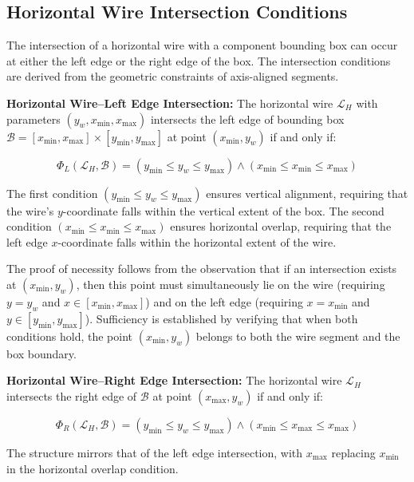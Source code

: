 \subsection{Horizontal Wire Intersection Conditions}

The intersection of a horizontal wire with a component bounding box can occur at either the left edge or the right edge of the box. The intersection conditions are derived from the geometric constraints of axis-aligned segments.

\textbf{Horizontal Wire–Left Edge Intersection:} The horizontal wire $\mathcal{L}_H$ with parameters $(y_w, x_{\min}, x_{\max})$ intersects the left edge of bounding box $\mathcal{B} = [x_{\min}, x_{\max}] \times [y_{\min}, y_{\max}]$ at point $(x_{\min}, y_w)$ if and only if:

\begin{equation}
\Phi_L(\mathcal{L}_H, \mathcal{B}) = (y_{\min} \le y_w \le y_{\max}) \land (x_{\min} \le x_{\min} \le x_{\max})
\label{eq:horizontal-left-intersection}
\end{equation}

The first condition $(y_{\min} \le y_w \le y_{\max})$ ensures vertical alignment, requiring that the wire's $y$-coordinate falls within the vertical extent of the box. The second condition $(x_{\min} \le x_{\min} \le x_{\max})$ ensures horizontal overlap, requiring that the left edge $x$-coordinate falls within the horizontal extent of the wire.

The proof of necessity follows from the observation that if an intersection exists at $(x_{\min}, y_w)$, then this point must simultaneously lie on the wire (requiring $y = y_w$ and $x \in [x_{\min}, x_{\max}]$) and on the left edge (requiring $x = x_{\min}$ and $y \in [y_{\min}, y_{\max}]$). Sufficiency is established by verifying that when both conditions hold, the point $(x_{\min}, y_w)$ belongs to both the wire segment and the box boundary.

\textbf{Horizontal Wire–Right Edge Intersection:} The horizontal wire $\mathcal{L}_H$ intersects the right edge of $\mathcal{B}$ at point $(x_{\max}, y_w)$ if and only if:

\begin{equation}
\Phi_R(\mathcal{L}_H, \mathcal{B}) = (y_{\min} \le y_w \le y_{\max}) \land (x_{\min} \le x_{\max} \le x_{\max})
\label{eq:horizontal-right-intersection}
\end{equation}

The structure mirrors that of the left edge intersection, with $x_{\max}$ replacing $x_{\min}$ in the horizontal overlap condition.

